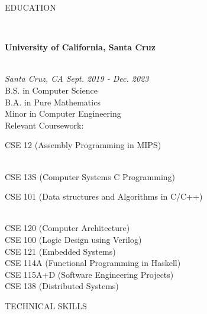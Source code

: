 \documentclass[letterpaper,10pt]{article}
\begin{document}
\begin{multicols*}{2}
  \begin{LARGE} \noindent\faSchool\hspace{5px}EDUCATION \end{LARGE}
  \vspace{.5em} \\
  \begin{large}
    \textbf{University of California, Santa Cruz}
  \end{large} \\
  \textit{Santa Cruz, CA \hfill Sept. 2019 - Dec. 2023\indent} \\
  B.S. in Computer Science \\
  B.A. in Pure Mathematics \\
  Minor in Computer Engineering \\
  Relevant Coursework: \\
  \indent \parbox{.45\textwidth}{CSE 12 (Assembly Programming in MIPS)}\\
  \indent CSE 13S (Computer Systems C Programming)\\
  \indent \parbox{.45\textwidth}{CSE 101 (Data structures and Algorithms in C/C++)}\\
  \indent CSE 120 (Computer Architecture)\\
  \indent CSE 100 (Logic Design using Verilog)\\
  \indent CSE 121 (Embedded Systems)\\
  \indent CSE 114A (Functional Programming in Haskell) \\
  \indent CSE 115A+D (Software Engineering Projects)\\
  \indent CSE 138 (Distributed Systems)
  \vspace{1em} \\
  \begin{LARGE} \faLaptop\hspace{5px}TECHNICAL SKILLS \end{LARGE}

\end{multicols*}
\end{document}
